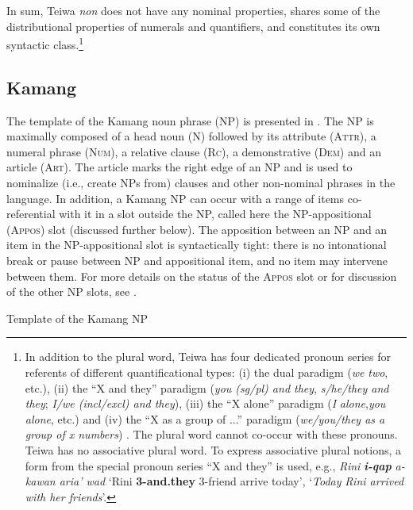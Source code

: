 In sum, Teiwa \textit{non} does not have any nominal properties, shares some of the distributional properties of numerals and quantifiers, and constitutes its own syntactic class.\footnote{In addition to the plural word, Teiwa has four dedicated pronoun series for referents of different quantificational types: (i) the dual paradigm (\textit{we} \textit{two}, etc.), 
(ii) the ``X and they'' paradigm (\textit{you (sg/pl) and they}, 
\textit{s/he/they and they};
\textit{I/we (incl/excl) and they}), 
(iii) the ``X alone'' paradigm (\textit{I} \textit{alone},\textit{you} \textit{alone}, etc.) and (iv) the ``X as a group of ...'' paradigm (\textit{we/you/they as a group of x numbers}) \citep[82-85]{Klamer2010grammar}. The plural word cannot co-occur with these pronouns. Teiwa has no associative plural word. To express associative plural notions, a form from the special pronoun series ``X and they'' is used, e.g., \textit{Rini} \textbf{\textit{i-qap}} \textit{a-kawan aria' wad } `Rini \textbf{3-and.they} 3-friend
arrive today',  `\textit{Today} \textit{Rini arrived with her friends}'.}

\subsection{Kamang} %
\label{sec:9:3.3}
The template of the Kamang noun phrase (NP) is presented in . The NP is maximally composed of a head noun (\textsc{N}) followed by its attribute (\textsc{Attr),} a numeral phrase \textsc{(Num)}, a relative clause (\textsc{Rc}), a demonstrative \textsc{(Dem)} and an article \textsc{(Art)}. The article marks the right edge of an NP and is used to nominalize (i.e., create NPs from) clauses and other non-nominal phrases in the language. In addition, a Kamang NP can occur with a range of items co-referential with it in a slot outside the NP, called here the NP-appositional (\textsc{Appos)} slot (discussed further below). The apposition between an NP and an item in the NP-appositional slot is syntactically tight: there is no intonational break or pause between NP and appositional item, and no item may intervene between them. For more details on the status of the \textsc{Appos} slot or for discussion of the other NP slots, see \citet{Schapperta}.

\ea%
\label{ex:9:31}
\upshape
Template of the Kamang NP  \citep{Schapperta}\\	

